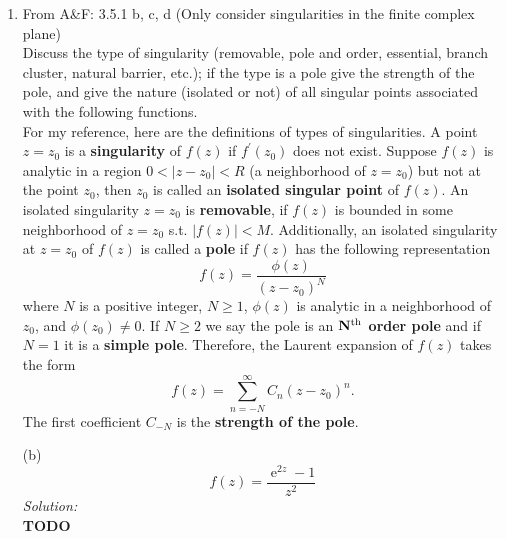 \documentclass[10pt]{amsart}
\DeclareMathOperator{\E}{e}
\theoremstyle{nonumberplain}
\begin{document}
\mline
\begin{enumerate}[label={\bf {\arabic*}:}]
\item  From A\&F: 3.5.1 b, c, d (Only consider singularities in the finite
  complex plane) \\
Discuss the type of singularity (removable, pole and order, essential, branch cluster, natural barrier, etc.); if the type is a pole give the strength of the pole,  and give the nature (isolated or not) of all singular points associated with the following functions. \\

\noindent
For my reference, here are the definitions of types of singularities.
A point $z=z_0$ is a {\bf singularity} of $f(z)$ if $f^\prime(z_0)$ does not exist.
Suppose $f(z)$ is analytic in a region $0 < |z - z_0| < R$ (a neighborhood of $z = z_0$) but not at the point $z_0$, then $z_0$ is called an {\bf isolated singular point} of $f(z)$.
An isolated singularity $z=z_0$ is {\bf removable}, if $f(z)$ is bounded in some neighborhood of $z=z_0$ s.t. $|f(z)| < M$.
Additionally, an isolated singularity at $z = z_0$ of $f(z)$ is called a {\bf pole} if $f(z)$ has the following representation
$$
f(z) = \frac {\phi (z)}{(z - z_0)^N}
$$
where $N$ is a positive integer, $N \geq 1$, $\phi(z)$ is analytic in a neighborhood of $z_0$, and $\phi(z_0) \neq 0$.
If $N \geq 2$ we say the pole is an {\bf ${\bf N}^{\rm th}$ order pole} and if $N = 1$ it is a {\bf simple pole}.
Therefore, the Laurent expansion of $f(z)$ takes the form
$$
f(z) = \sum_{n=-N}^\infty C_n(z - z_0)^n.
$$
The first coefficient $C_{-N}$ is the {\bf strength of the pole}.

\noindent
(b)
$$
f(z) = \frac {\E^{2z} - 1} {z^2}
$$
\textit{Solution:} \\
\textbf{TODO} \\


\end{enumerate}
\end{document}
